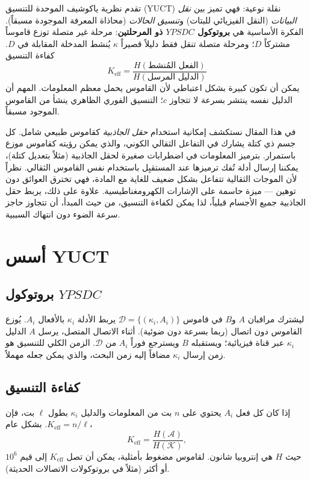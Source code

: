 \documentclass[11pt,a4paper]{article}
\newcommand{\Keff}{K_{\mathrm{eff}}}
\newcommand{\YPSDC}{YPSDC}
\begin{document}
	تقدم نظرية ياكوشيف الموحدة للتنسيق (YUCT) \cite{Yakushev2026} نقلة نوعية: فهي تميز بين \emph{نقل البيانات} (النقل الفيزيائي للبتات) و\emph{تنسيق الحالات} (محاذاة المعرفة الموجودة مسبقاً). الفكرة الأساسية هي \textbf{بروتوكول \(\YPSDC\) ذو المرحلتين}: مرحلة غير متصلة توزع قاموساً مشتركاً \(D\)؛ ومرحلة متصلة تنقل فقط دليلاً قصيراً \(\kappa\) يُنشط المدخلة المقابلة في \(D\). كفاءة التنسيق
	\begin{equation}
		\Keff = \frac{H(\text{الفعل المُنشط})}{H(\text{الدليل المرسل})}
	\end{equation}
	يمكن أن تكون كبيرة بشكل اعتباطي لأن القاموس يحمل معظم المعلومات. المهم أن الدليل نفسه ينتشر بسرعة لا تتجاوز \(c\)؛ التنسيق الفوري الظاهري ينشأ من القاموس الموجود مسبقاً.
	
	في هذا المقال نستكشف إمكانية استخدام \emph{حقل الجاذبية} كقاموس طبيعي شامل. كل جسم ذي كتلة يشارك في التفاعل الثقالي الكوني، والذي يمكن رؤيته كقاموس موزع باستمرار. بترميز المعلومات في اضطرابات صغيرة لحقل الجاذبية (مثلاً بتعديل كتلة)، يمكننا إرسال أدلة تُفك ترميزها عند المستقبِل باستخدام نفس القاموس الثقالي. نظراً لأن الموجات الثقالية تتفاعل بشكل ضعيف للغاية مع المادة، فهي تخترق العوائق دون توهين — ميزة حاسمة على الإشارات الكهرومغناطيسية. علاوة على ذلك، يربط حقل الجاذبية جميع الأجسام قبلياً، لذا يمكن لكفاءة التنسيق، من حيث المبدأ، أن تتجاوز حاجز سرعة الضوء دون انتهاك السببية.
	
	\section{أسس YUCT}
	\label{sec:foundations}
	
	\subsection{بروتوكول \(\YPSDC\)}
	\label{subsec:ypsdc}
	
	ليشترك مراقبان \(A\) و\(B\) في قاموس \(\mathcal{D} = \{ (\kappa_i, A_i) \}\) يربط الأدلة \(\kappa_i\) بالأفعال \(A_i\). يُوزع القاموس دون اتصال (ربما بسرعة دون ضوئية). أثناء الاتصال المتصل، يرسل \(A\) الدليل \(\kappa_i\) عبر قناة فيزيائية؛ ويستقبله \(B\) ويسترجع فوراً \(A_i\) من \(\mathcal{D}\). الزمن الكلي للتنسيق هو زمن إرسال \(\kappa_i\) مضافاً إليه زمن البحث، والذي يمكن جعله مهملاً.
	
	\subsection{كفاءة التنسيق}
	\label{subsec:keff}
	
	إذا كان كل فعل \(A_i\) يحتوي على \(n\) بت من المعلومات والدليل \(\kappa_i\) بطول \(\ell\) بت، فإن \(\Keff = n/\ell\). بشكل عام،
	\begin{equation}
		\Keff = \frac{H(\mathcal{A})}{H(\mathcal{K})},
	\end{equation}
	حيث \(H\) هي إنتروبيا شانون. لقاموس مضغوط بأمثلية، يمكن أن تصل \(\Keff\) إلى قيم \(10^6\) أو أكثر (مثلاً في بروتوكولات الاتصالات الحديثة).
	
\end{document}
